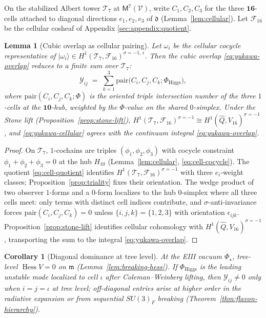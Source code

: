 \documentclass[aps,prd,onecolumn,amsmath,amssymb,nofootinbib,11pt]{revtex4-2}
\numberwithin{equation}{section}
\theoremstyle{plain}
\newtheorem{lemma}[theorem]{Lemma}
\newtheorem{corollary}[theorem]{Corollary}
\theoremstyle{definition}
\theoremstyle{remark}
\newcommand{\Void}{\mathcal{V}}
\newcommand{\Mirror}{\mathsf{M}}
\newcommand{\orderparam}{\Phi}
\newcommand{\Hess}{\operatorname{Hess}}
\begin{document}
On the stabilized Albert tower $\mathcal{T}_7$ at $\Mirror^7(\Void)$, write
$C_1,C_2,C_3$ for the three $\mathbf{16}$-cells attached to diagonal
directions $e_1,e_2,e_3$ of $\mathfrak{d}$ (Lemma~\ref{lem:cellular}).
Let $\mathcal{F}_{16}$ be the cellular cosheaf of Appendix
\ref{sec:appendix:quotient}.

\begin{lemma}[Cubic overlap as cellular pairing]\label{lem:yukawa-cellular}
Let $\omega_i$ be the cellular cocycle representative of
$|\omega_i\rangle\in H^1(\mathcal{T}_7,\mathcal{F}_{16})^{\sigma=-1,\,i}$.
Then the cubic overlap \eqref{eq:yukawa-overlap} reduces to a finite sum
over $\mathcal{T}_7$:
\begin{equation}\label{eq:yukawa-cellular}
  \mathcal{Y}_{ij}
  \;=\;
  \sum_{k=1}^3
  \mathrm{pair}\!\bigl(C_i,C_j,C_k;\Phi_{\mathrm{Higgs}}\bigr),
\end{equation}
where $\mathrm{pair}(C_i,C_j,C_k;\Phi)$ is the oriented triple intersection
number of the three $1$-cells at the $\mathbf{10}$-hub, weighted by the
$\Phi$-value on the shared $0$-simplex. Under the Stone lift
(Proposition~\ref{prop:stone-lift}),
$H^1(\mathcal{T}_7,\mathcal{F}_{16})^{\sigma=-1}\cong
H^1(\hat Q,V_{16})^{\sigma=-1}$, and \eqref{eq:yukawa-cellular} agrees with
the continuum integral \eqref{eq:yukawa-overlap}.
\end{lemma}

\begin{proof}
On $\mathcal{T}_7$, $1$-cochains are triples $(\phi_1,\phi_2,\phi_3)$ with
cocycle constraint $\phi_1+\phi_2+\phi_3=0$ at the hub $H_{10}$
(Lemma~\ref{lem:cellular}, \eqref{eq:cell-cocycle}). The quotient
\eqref{eq:cell-quotient} identifies
$H^1(\mathcal{T}_7,\mathcal{F}_{16})^{\sigma=-1}$ with three
$e_i$-weight classes; Proposition~\ref{prop:triality} fixes their orientation.
The wedge product of two observer $1$-forms and a $0$-form localizes to the hub
$0$-simplex where all three cells meet: only terms with distinct cell indices
contribute, and $\sigma$-anti-invariance forces
$\mathrm{pair}(C_i,C_j,C_k)=0$ unless $\{i,j,k\}=\{1,2,3\}$ with orientation
$\epsilon_{ijk}$. Proposition~\ref{prop:stone-lift} identifies cellular
cohomology with $H^1(\hat Q,V_{16})^{\sigma=-1}$, transporting the sum to the
integral \eqref{eq:yukawa-overlap}.
\end{proof}

\begin{corollary}[Diagonal dominance at tree level]\label{cor:yukawa-diagonal}
At the EIII vacuum $\orderparam_\star$, tree-level $\Hess V=0$ on
$\mathfrak{m}$ (Lemma~\ref{lem:breaking-hess}). If
$\Phi_{\mathrm{Higgs}}$ is the leading unstable mode localized to cell
$\iota$ after Coleman--Weinberg lifting, then
$\mathcal{Y}_{ij}\neq0$ only when $i=j=\iota$ at tree level; off-diagonal
entries arise at higher order in the radiative expansion or from sequential
$SU(3)_F$ breaking (Theorem~\ref{thm:flavon-hierarchy}).
\end{corollary}
\end{document}
